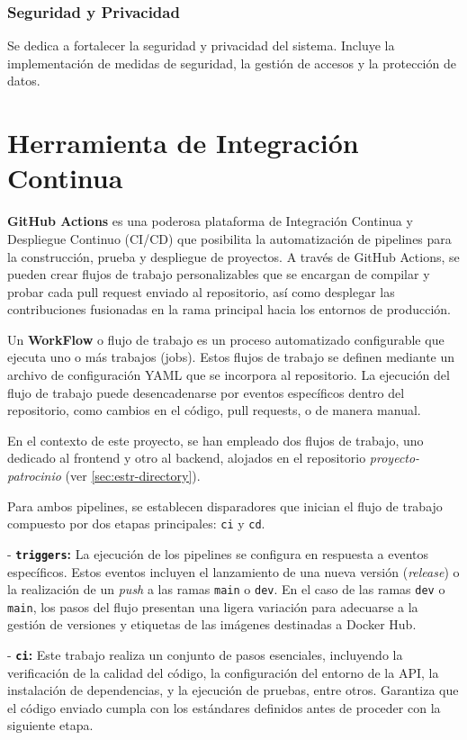 \subsubsection{Seguridad y Privacidad}
Se dedica a fortalecer la seguridad y privacidad del sistema. Incluye la implementación de medidas de seguridad, la gestión de accesos y la protección de datos.



\section{Herramienta de Integración Continua}

\textbf{GitHub Actions} es una poderosa plataforma de Integración Continua y Despliegue Continuo (CI/CD) que posibilita la automatización de pipelines para la construcción, prueba y despliegue de proyectos. A través de GitHub Actions, se pueden crear flujos de trabajo personalizables que se encargan de compilar y probar cada pull request enviado al repositorio, así como desplegar las contribuciones fusionadas en la rama principal hacia los entornos de producción.

Un \textbf{WorkFlow} o flujo de trabajo es un proceso automatizado configurable que ejecuta uno o más trabajos (jobs). Estos flujos de trabajo se definen mediante un archivo de configuración YAML que se incorpora al repositorio. La ejecución del flujo de trabajo puede desencadenarse por eventos específicos dentro del repositorio, como cambios en el código, pull requests, o de manera manual.

En el contexto de este proyecto, se han empleado dos flujos de trabajo, uno dedicado al frontend y otro al backend, alojados en el repositorio \textit{proyecto-patrocinio} (ver \ref{sec:estr-directory}).

Para ambos pipelines, se establecen disparadores que inician el flujo de trabajo compuesto por dos etapas principales: \texttt{ci} y \texttt{cd}.

- \textbf{\texttt{triggers}:} La ejecución de los pipelines se configura en respuesta a eventos específicos. Estos eventos incluyen el lanzamiento de una nueva versión (\textit{release}) o la realización de un \textit{push} a las ramas \texttt{main} o \texttt{dev}. En el caso de las ramas \texttt{dev} o \texttt{main}, los pasos del flujo presentan una ligera variación para adecuarse a la gestión de versiones y etiquetas de las imágenes destinadas a Docker Hub.

- \textbf{\texttt{ci}:} Este trabajo realiza un conjunto de pasos esenciales, incluyendo la verificación de la calidad del código, la configuración del entorno de la API, la instalación de dependencias, y la ejecución de pruebas, entre otros. Garantiza que el código enviado cumpla con los estándares definidos antes de proceder con la siguiente etapa.

